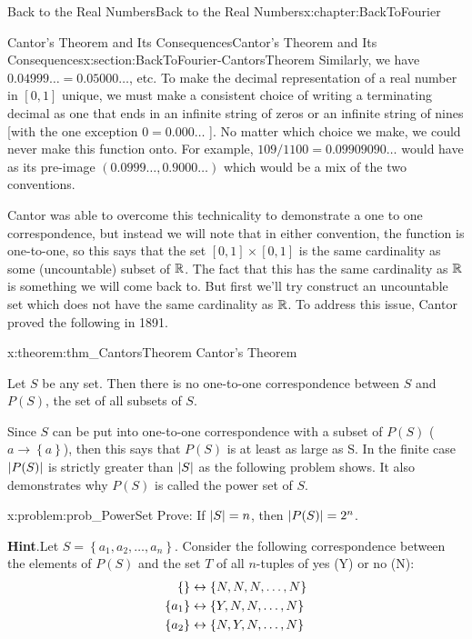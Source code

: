 \begin{chapterptx}{Back to the Real Numbers}{}{Back to the Real Numbers}{}{}{x:chapter:BackToFourier}
\begin{sectionptx}{Cantor's Theorem and Its Consequences}{}{Cantor's Theorem and Its Consequences}{}{}{x:section:BackToFourier-CantorsTheorem}
		Similarly, we have \(0.04999\ldots=0.05000\ldots\), etc. To make the decimal representation of a real number in \([0,1]\) unique, we must make a consistent choice of writing a terminating decimal as one that ends in an infinite string of zeros or an infinite string of nines [with the one exception \(0=0.000\ldots\) ]. No matter which choice we make, we could never make this function onto. For example, \(109/1100=0.09909090\ldots\) would have as its pre-image \((0.0999\ldots,0.9000\ldots)\) which would be a mix of the two conventions.%
		\par
		Cantor was able to overcome this technicality to demonstrate a one to one correspondence, but instead we will note that in either convention, the function is one-to-one, so this says that the set \([0,1]\times[0,1]\) is the same cardinality as some (uncountable) subset of \(\mathbb {R}\).  The fact that this has the same cardinality as \(\mathbb {R}\) is something we will come back to. But first we'll try construct an uncountable set which does not have the same cardinality as \(\mathbb {R}\).  To address this issue, Cantor proved the following in 1891.%
		\begin{theorem}{}{}{x:theorem:thm_CantorsTheorem}%
			\alert{Cantor's Theorem}%
			\par
			 Let \(S\) be any set.  Then there is no one-to-one correspondence between \(S\) and \(P(S)\), the set of all subsets of \(S\).%
		\end{theorem}
		Since \(S\) can be put into one-to-one correspondence with a subset of \(P(S)\) (\(a\rightarrow \left\{a\right\}\)), then this says that \(P(S)\) is at least as large as S. In the finite case \(\left|P(S)\right|\) is strictly greater than \(\left|S\right|\) as the following problem shows. It also demonstrates why \(P(S)\) is called the power set of \(S\).%
		\begin{problem}{}{x:problem:prob_PowerSet}%
			Prove: If \(\left|S\right|=n\), then \(\left| P(S)\right|=2^n\).%
			\par\smallskip%
			\noindent\textbf{\blocktitlefont Hint}.\hypertarget{g:hint:idp352}{}\quad{}Let \(S=\left\{a_1,a_2,\ldots,a_n\right\}\). Consider the following correspondence between the elements of \(P(S)\) and the set \(T\) of all \(n\)-tuples of yes (Y) or no (N):%
			\begin{align*}
				\{ \}  \amp \leftrightarrow \{N,N,N,\ldots,N\}\\
				\{a_1\}\amp \leftrightarrow \{Y,N,N,\ldots ,N\}\\
				\{a_2\}\amp \leftrightarrow \{N,Y,N,\ldots,N\}\\

\end{align*}
\end{problem}
\end{sectionptx}
\end{chapterptx}
